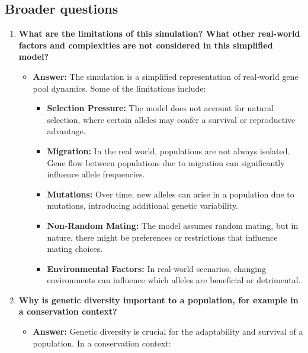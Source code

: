 \documentclass[
  a4paper]{book}
\providecommand{\tightlist}{%
  \setlength{\itemsep}{0pt}\setlength{\parskip}{0pt}}
\begin{document}
\subsection{Broader questions}\label{broader-questions}

\begin{enumerate}
\def\labelenumi{\arabic{enumi}.}
\tightlist
\item
  \textbf{What are the limitations of this simulation? What other real-world factors and complexities are not considered in this simplified model?}

  \begin{itemize}
  \tightlist
  \item
    \textbf{Answer:} The simulation is a simplified representation of real-world gene pool dynamics. Some of the limitations include:

    \begin{itemize}
    \tightlist
    \item
      \textbf{Selection Pressure:} The model does not account for natural selection, where certain alleles may confer a survival or reproductive advantage.
    \item
      \textbf{Migration:} In the real world, populations are not always isolated. Gene flow between populations due to migration can significantly influence allele frequencies.
    \item
      \textbf{Mutations:} Over time, new alleles can arise in a population due to mutations, introducing additional genetic variability.
    \item
      \textbf{Non-Random Mating:} The model assumes random mating, but in nature, there might be preferences or restrictions that influence mating choices.
    \item
      \textbf{Environmental Factors:} In real-world scenarios, changing environments can influence which alleles are beneficial or detrimental.
    \end{itemize}
  \end{itemize}
\item
  \textbf{Why is genetic diversity important to a population, for example in a conservation context?}

  \begin{itemize}
  \tightlist
  \item
    \textbf{Answer:} Genetic diversity is crucial for the adaptability and survival of a population. In a conservation context:


\end{itemize}
\end{enumerate}
\end{document}
